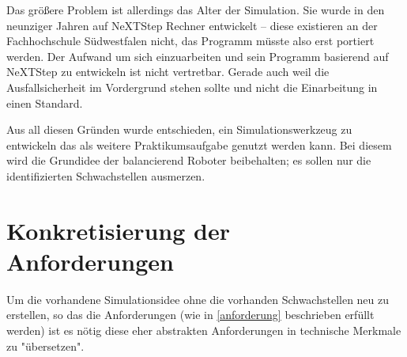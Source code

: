 Das gr{\"{o}}{\ss}ere Problem ist allerdings das Alter der Simulation. Sie wurde in den neunziger Jahren auf 
NeXTStep Rechner entwickelt -- diese existieren an der Fachhochschule S{\"{u}}dwestfalen nicht, das Programm 
m{\"{u}}sste also erst portiert werden. Der Aufwand um sich einzuarbeiten und sein Programm basierend auf
NeXTStep zu entwickeln ist nicht vertretbar. Gerade auch weil die Ausfallsicherheit im Vordergrund stehen sollte und
nicht die Einarbeitung in einen Standard.

Aus all diesen Gr{\"{u}}nden wurde entschieden, ein Simulationswerkzeug zu entwickeln das als weitere Praktikumsaufgabe
genutzt werden kann. Bei diesem wird die Grundidee der balancierend Roboter beibehalten; es sollen nur die identifizierten
Schwachstellen ausmerzen.

\clearpage
\section{Konkretisierung der Anforderungen}
Um die vorhandene Simulationsidee ohne die vorhanden Schwachstellen neu zu erstellen, so das die Anforderungen
(wie in \ref{anforderung} beschrieben erf{\"{u}}llt werden) ist es n{\"{o}}tig diese eher abstrakten Anforderungen in
technische Merkmale zu "{\"{u}}bersetzen".

